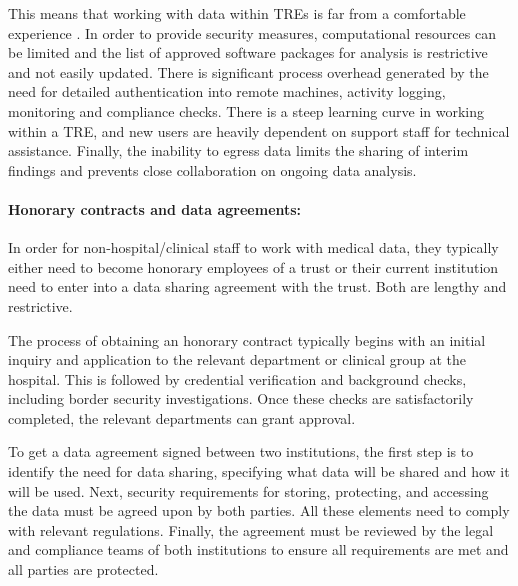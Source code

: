 \documentclass[11pt]{article}
\begin{document}
This means that working with data within TREs is far from a comfortable experience \cite{ODonovan2023}. In order to provide security measures, computational resources can be limited and the list of approved software packages for analysis is restrictive and not easily updated. There is significant process overhead generated by the need for detailed authentication into remote machines, activity logging, monitoring and compliance checks. There is a steep learning curve in working within a TRE, and new users are heavily dependent on support staff for technical assistance. Finally, the inability to egress data limits the sharing of interim findings and prevents close collaboration on ongoing data analysis.

\paragraph{Honorary contracts and data agreements:}

In order for non-hospital/clinical staff to work with medical data, they typically either need to become honorary employees of a trust or their current institution need to enter into a data sharing agreement with the trust. Both are lengthy and restrictive.

The process of obtaining an honorary contract typically begins with an initial inquiry and application to the relevant department or clinical group at the hospital. This is followed by credential verification and background checks, including border security investigations. Once these checks are satisfactorily completed, the relevant departments can grant approval. 

To get a data agreement signed between two institutions, the first step is to identify the need for data sharing, specifying what data will be shared and how it will be used. Next, security requirements for storing, protecting, and accessing the data must be agreed upon by both parties. All these elements need to comply with relevant regulations. Finally, the agreement must be reviewed by the legal and compliance teams of both institutions to ensure all requirements are met and all parties are protected.

\end{document}
